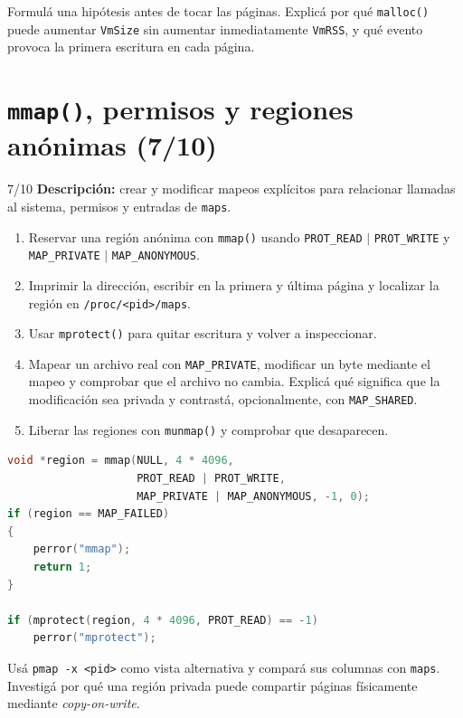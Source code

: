 \documentclass[11pt,a4paper]{article}
\begin{document}
\begin{extrabox}
Formulá una hipótesis antes de tocar las páginas. Explicá por qué
\texttt{malloc()} puede aumentar \texttt{VmSize} sin aumentar inmediatamente
\texttt{VmRSS}, y qué evento provoca la primera escritura en cada página.
\end{extrabox}

\newpage
\section{\texttt{mmap()}, permisos y regiones anónimas (7/10)}

\begin{trackbox}{7/10}
\textbf{Descripción:} crear y modificar mapeos explícitos para relacionar
llamadas al sistema, permisos y entradas de \texttt{maps}.
\end{trackbox}

\begin{enumerate}[leftmargin=*]
  \item Reservar una región anónima con \texttt{mmap()} usando
  \texttt{PROT\_READ} $|$ \texttt{PROT\_WRITE} y
  \texttt{MAP\_PRIVATE} $|$ \texttt{MAP\_ANONYMOUS}.
  \item Imprimir la dirección, escribir en la primera y última página y
  localizar la región en \texttt{/proc/<pid>/maps}.
  \item Usar \texttt{mprotect()} para quitar escritura y volver a inspeccionar.
  \item Mapear un archivo real con \texttt{MAP\_PRIVATE}, modificar un byte
  mediante el mapeo y comprobar que el archivo no cambia. Explicá qué significa
  que la modificación sea privada y contrastá, opcionalmente, con
  \texttt{MAP\_SHARED}.
  \item Liberar las regiones con \texttt{munmap()} y comprobar que desaparecen.
\end{enumerate}

\begin{lstlisting}[language=C]
void *region = mmap(NULL, 4 * 4096,
                    PROT_READ | PROT_WRITE,
                    MAP_PRIVATE | MAP_ANONYMOUS, -1, 0);
if (region == MAP_FAILED)
{
    perror("mmap");
    return 1;
}

if (mprotect(region, 4 * 4096, PROT_READ) == -1)
    perror("mprotect");
\end{lstlisting}

Usá \texttt{pmap -x <pid>} como vista alternativa y compará sus columnas con
\texttt{maps}. Investigá por qué una región privada puede compartir páginas
físicamente mediante \emph{copy-on-write}.
\end{document}
